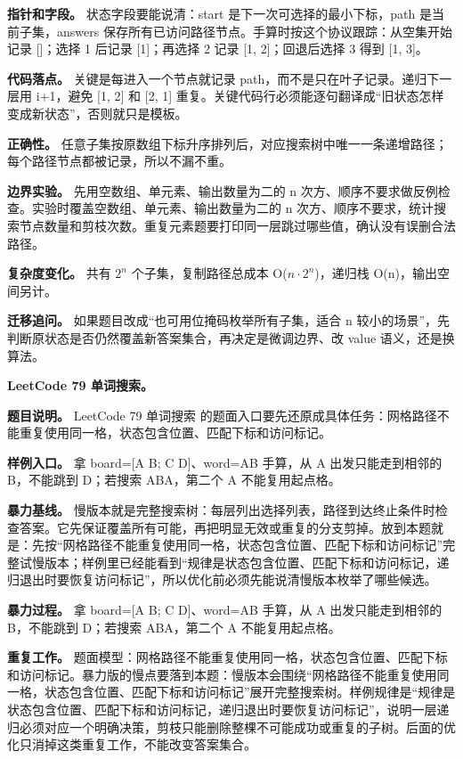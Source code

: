 \textbf{指针和字段。} 状态字段要能说清：start 是下一次可选择的最小下标，path 是当前子集，answers 保存所有已访问路径节点。手算时按这个协议跟踪：从空集开始记录 []；选择 1 后记录 [1]；再选择 2 记录 [1, 2]；回退后选择 3 得到 [1, 3]。

\textbf{代码落点。} 关键是每进入一个节点就记录 path，而不是只在叶子记录。递归下一层用 i+1，避免 [1, 2] 和 [2, 1] 重复。关键代码行必须能逐句翻译成“旧状态怎样变成新状态”，否则就只是模板。

\textbf{正确性。} 任意子集按原数组下标升序排列后，对应搜索树中唯一一条递增路径；每个路径节点都被记录，所以不漏不重。

\textbf{边界实验。} 先用空数组、单元素、输出数量为二的 n 次方、顺序不要求做反例检查。实验时覆盖空数组、单元素、输出数量为二的 n 次方、顺序不要求，统计搜索节点数量和剪枝次数。重复元素题要打印同一层跳过哪些值，确认没有误删合法路径。

\textbf{复杂度变化。} 共有 \ensuremath{2^{n}} 个子集，复制路径总成本 O(\ensuremath{n \cdot 2^{n}})，递归栈 O(n)，输出空间另计。

\textbf{迁移追问。} 如果题目改成“也可用位掩码枚举所有子集，适合 n 较小的场景”，先判断原状态是否仍然覆盖新答案集合，再决定是微调边界、改 value 语义，还是换算法。

\noindent\textbf{LeetCode 79 单词搜索。}

\textbf{题目说明。} LeetCode 79 单词搜索 的题面入口要先还原成具体任务：网格路径不能重复使用同一格，状态包含位置、匹配下标和访问标记。

\textbf{样例入口。} 拿 board=[A B; C D]、word=AB 手算，从 A 出发只能走到相邻的 B，不能跳到 D；若搜索 ABA，第二个 A 不能复用起点格。

\textbf{暴力基线。} 慢版本就是完整搜索树：每层列出选择列表，路径到达终止条件时检查答案。它先保证覆盖所有可能，再把明显无效或重复的分支剪掉。放到本题就是：先按“网格路径不能重复使用同一格，状态包含位置、匹配下标和访问标记”完整试慢版本；样例里已经能看到“规律是状态包含位置、匹配下标和访问标记，递归退出时要恢复访问标记”，所以优化前必须先能说清慢版本枚举了哪些候选。

\textbf{暴力过程。} 拿 board=[A B; C D]、word=AB 手算，从 A 出发只能走到相邻的 B，不能跳到 D；若搜索 ABA，第二个 A 不能复用起点格。

\textbf{重复工作。} 题面模型：网格路径不能重复使用同一格，状态包含位置、匹配下标和访问标记。暴力版的慢点要落到本题：慢版本会围绕“网格路径不能重复使用同一格，状态包含位置、匹配下标和访问标记”展开完整搜索树。样例规律是“规律是状态包含位置、匹配下标和访问标记，递归退出时要恢复访问标记”，说明一层递归必须对应一个明确决策，剪枝只能删除整棵不可能成功或重复的子树。后面的优化只消掉这类重复工作，不能改变答案集合。

